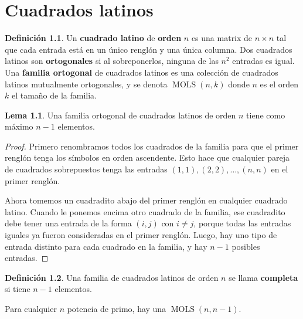 \documentclass[spanish]{book}
\theoremstyle{definition}
\newtheorem*{defn}{Definición}
\newtheorem*{lema}{Lema}
\DeclareMathOperator{\MOLS}{MOLS}
\begin{document}
\chapter{Cuadrados latinos}
\begin{defn}
	Un \textbf{cuadrado latino} de \textbf{orden} $n$ es una matrix de $n\times n$ tal que cada entrada está en un único renglón y una única columna. Dos cuadrados latinos son \textbf{ortogonales} si al sobreponerlos, ninguna de las $n^2$ entradas es igual. Una \textbf{familia ortogonal} de cuadrados latinos es una colección de cuadrados latinos mutualmente ortogonales, y se denota $\MOLS(n,k)$ donde $n$ es el orden $k$ el tamaño de la familia.
\end{defn}
\begin{lema}
	Una familia ortogonal de cuadrados latinos de orden $n$ tiene como máximo $n-1$ elementos.
\end{lema}
\begin{proof}
	Primero renombramos todos los cuadrados de la familia para que el primer renglón tenga los símbolos en orden ascendente. Esto hace que cualquier pareja de cuadrados sobrepuestos tenga las entradas $(1,1),(2,2),\ldots,(n,n)$ en el primer renglón.
	
	Ahora tomemos un cuadradito abajo del primer renglón en cualquier cuadrado latino. Cuando le ponemos encima otro cuadrado de la familia, ese cuadradito debe tener una entrada de la forma $(i,j)$ con $i\neq j$, porque todas las entradas iguales ya fueron consideradas en el primer renglón. Luego, hay uno tipo de entrada distinto para cada cuadrado en la familia, y hay $n-1$ posibles entradas.
\end{proof}
\begin{defn}
	Una familia de cuadrados latinos de orden $n$ se llama \textbf{completa} si tiene $n-1$ elementos. 
\end{defn}
\begin{teo}
	Para cualquier $n$ potencia de primo, hay una $\MOLS(n,n-1)$.
\end{teo}
\end{document}
